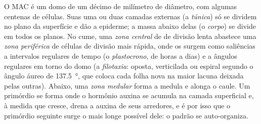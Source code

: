 \begin{proposition}\label{prop:b2:plant-meristems:sam}
O MAC é um domo de um décimo de milímetro de diâmetro, com algumas
centenas de células. Suas uma ou duas camadas externas (a
\emph{túnica}) só se dividem no plano da superfície e dão a epiderme; a
massa abaixo delas (o \emph{corpo}) se divide em todos os planos. No
cume, uma \emph{zona central} de  de divisão lenta
abastece uma \emph{zona periférica} de células de divisão mais rápida,
onde os \emph{} surgem como saliências a intervalos
regulares de tempo (o \emph{plastocrono}, de horas a dias) e a ângulos
regulares em torno do domo (a \emph{filotaxia}: oposta, verticilada ou
espiral segundo o ângulo áureo de \qty{137.5}{\degree}, que coloca cada
folha nova na maior lacuna deixada pelas outras). Abaixo, uma
\emph{zona medular} forma a medula e alonga o caule. Um primórdio se
forma onde o hormônio auxina se acumula na camada superficial e, à
medida que cresce, drena a auxina de seus arredores, e é por isso que o
primórdio seguinte surge o mais longe possível dele: o padrão se
auto-organiza.
\end{proposition}

